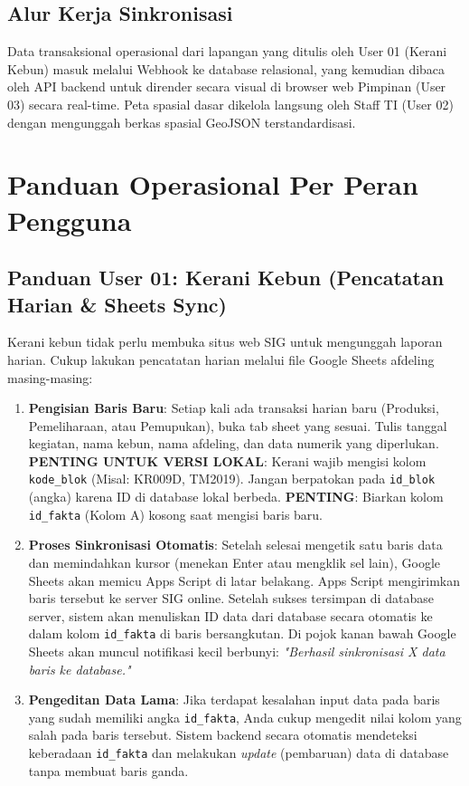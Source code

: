 \documentclass[12pt, a4paper]{article}
\begin{document}
\subsection{Alur Kerja Sinkronisasi}
Data transaksional operasional dari lapangan yang ditulis oleh User 01 (Kerani Kebun) masuk melalui Webhook ke database relasional, yang kemudian dibaca oleh API backend untuk dirender secara visual di browser web Pimpinan (User 03) secara real-time. Peta spasial dasar dikelola langsung oleh Staff TI (User 02) dengan mengunggah berkas spasial GeoJSON terstandardisasi.

\newpage

\section{Panduan Operasional Per Peran Pengguna}

\subsection{Panduan User 01: Kerani Kebun (Pencatatan Harian \& Sheets Sync)}
Kerani kebun tidak perlu membuka situs web SIG untuk mengunggah laporan harian. Cukup lakukan pencatatan harian melalui file Google Sheets afdeling masing-masing:
\begin{enumerate}
    \item \textbf{Pengisian Baris Baru}: Setiap kali ada transaksi harian baru (Produksi, Pemeliharaan, atau Pemupukan), buka tab sheet yang sesuai. Tulis tanggal kegiatan, nama kebun, nama afdeling, dan data numerik yang diperlukan. \textbf{PENTING UNTUK VERSI LOKAL}: Kerani wajib mengisi kolom \texttt{kode\_blok} (Misal: KR009D, TM2019). Jangan berpatokan pada \texttt{id\_blok} (angka) karena ID di database lokal berbeda. \textbf{PENTING}: Biarkan kolom \texttt{id\_fakta} (Kolom A) kosong saat mengisi baris baru.
    \item \textbf{Proses Sinkronisasi Otomatis}: Setelah selesai mengetik satu baris data dan memindahkan kursor (menekan Enter atau mengklik sel lain), Google Sheets akan memicu Apps Script di latar belakang. Apps Script mengirimkan baris tersebut ke server SIG online. Setelah sukses tersimpan di database server, sistem akan menuliskan ID data dari database secara otomatis ke dalam kolom \texttt{id\_fakta} di baris bersangkutan. Di pojok kanan bawah Google Sheets akan muncul notifikasi kecil berbunyi: \textit{"Berhasil sinkronisasi X data baris ke database."}
    \item \textbf{Pengeditan Data Lama}: Jika terdapat kesalahan input data pada baris yang sudah memiliki angka \texttt{id\_fakta}, Anda cukup mengedit nilai kolom yang salah pada baris tersebut. Sistem backend secara otomatis mendeteksi keberadaan \texttt{id\_fakta} dan melakukan \textit{update} (pembaruan) data di database tanpa membuat baris ganda.
\end{enumerate}
\end{document}
